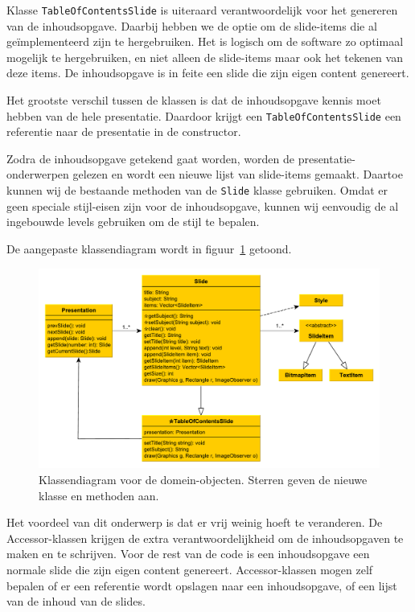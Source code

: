 \documentclass[a4paper]{article}
\newcommand{\code}[1]{\lstinline[columns=fixed]{#1}}
\begin{document}
    Klasse \code{TableOfContentsSlide} is uiteraard verantwoordelijk voor het genereren van de inhoudsopgave.
    Daarbij hebben we de optie om de slide-items die al geïmplementeerd zijn te hergebruiken.
    Het is logisch om de software zo optimaal mogelijk te hergebruiken, en niet alleen de slide-items maar ook het tekenen van deze items.
    De inhoudsopgave is in feite een slide die zijn eigen content genereert.
    
    Het grootste verschil tussen de klassen is dat de inhoudsopgave kennis moet hebben van de hele presentatie.
    Daardoor krijgt een \code{TableOfContentsSlide} een referentie naar de presentatie in de constructor.

    Zodra de inhoudsopgave getekend gaat worden, worden de presentatie-onder\-werpen gelezen en wordt een nieuwe lijst van slide-items gemaakt.
    Daartoe kunnen wij de bestaande methoden van de \code{Slide} klasse gebruiken.
    Omdat er geen speciale stijl-eisen zijn voor de inhoudsopgave, kunnen wij eenvoudig de al ingebouwde levels gebruiken om de stijl te bepalen.

    De aangepaste klassendiagram wordt in figuur~\ref{fig:design} getoond.
    \begin{figure}[!htb]
     \caption{
        Klassendiagram voor de domein-objecten.\label{fig:design}
        Sterren geven de nieuwe klasse en methoden aan.
     }
     \centering \includegraphics[width=\textwidth]{Diagrams/design.pdf}
    \end{figure}

    Het voordeel van dit onderwerp is dat er vrij weinig hoeft te veranderen.
    De Accessor-klassen krijgen de extra verantwoordelijkheid om de inhoudsopgaven te maken en te schrijven.
    Voor de rest van de code is een inhoudsopgave een normale slide die zijn eigen content genereert.
    Accessor-klassen mogen zelf bepalen of er een referentie wordt opslagen naar een inhoudsopgave, of een lijst van de inhoud van de slides.
\end{document}
